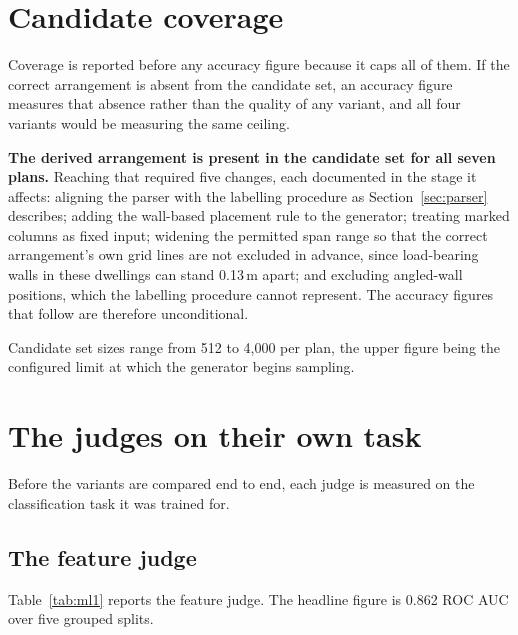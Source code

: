 \section{Candidate coverage}
\label{sec:coverage}

Coverage is reported before any accuracy figure because it caps all of
them. If the correct arrangement is absent from the candidate set, an
accuracy figure measures that absence rather than the quality of any
variant, and all four variants would be measuring the same ceiling.

\textbf{The derived arrangement is present in the candidate set for all
seven plans.} Reaching that required five changes, each documented in the
stage it affects: aligning the parser with the labelling procedure as
Section~\ref{sec:parser} describes; adding the wall-based placement rule to
the generator; treating marked columns as fixed input; widening the
permitted span range so that the correct arrangement's own grid lines are
not excluded in advance, since load-bearing walls in these dwellings can
stand 0.13\,m apart; and excluding angled-wall positions, which the
labelling procedure cannot represent. The accuracy figures that follow are
therefore unconditional.

Candidate set sizes range from 512 to 4,000 per plan, the upper figure
being the configured limit at which the generator begins sampling.

\section{The judges on their own task}
\label{sec:mlresults}

Before the variants are compared end to end, each judge is measured on the
classification task it was trained for.

\subsection{The feature judge}

Table~\ref{tab:ml1} reports the feature judge. The headline figure is
0.862 ROC AUC over five grouped splits.

\begin{table}[H]
\centering
\caption[The feature judge]{The feature judge. The pooled figure is the
mean over five grouped splits with its standard deviation; the remaining
rows are single deterministic runs. ``Against transplant examples only''
restricts the negative class to one kind at a time.}
\label{tab:ml1}
\small

\end{table}

